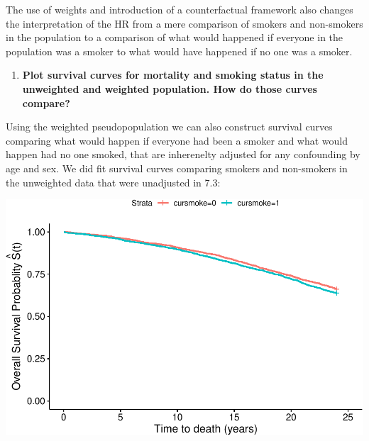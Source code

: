 \documentclass[
]{book}
\newenvironment{Shaded}{\begin{snugshade}}{\end{snugshade}}
\newcommand{\DataTypeTok}[1]{\textcolor[rgb]{0.13,0.29,0.53}{#1}}
\newcommand{\KeywordTok}[1]{\textcolor[rgb]{0.13,0.29,0.53}{\textbf{#1}}}
\newcommand{\NormalTok}[1]{#1}
\newcommand{\OperatorTok}[1]{\textcolor[rgb]{0.81,0.36,0.00}{\textbf{#1}}}
\newcommand{\StringTok}[1]{\textcolor[rgb]{0.31,0.60,0.02}{#1}}
\providecommand{\tightlist}{%
  \setlength{\itemsep}{0pt}\setlength{\parskip}{0pt}}
\begin{document}
The use of weights and introduction of a counterfactual framework also changes the interpretation of the HR from a mere comparison of smokers and non-smokers in the population to a comparison of what would happened if everyone in the population was a smoker to what would have happened if no one was a smoker.

\begin{enumerate}
\def\labelenumi{\arabic{enumi}.}
\setcounter{enumi}{1}
\tightlist
\item
  \textbf{Plot survival curves for mortality and smoking status in the unweighted and weighted population. How do those curves compare?}
\end{enumerate}

Using the weighted pseudopopulation we can also construct survival curves comparing what would happen if everyone had been a smoker and what would happen had no one smoked, that are inherenelty adjusted for any confounding by age and sex. We did fit survival curves comparing smokers and non-smokers in the unweighted data that were unadjusted in 7.3:

\begin{Shaded}
\end{Shaded}

\includegraphics{adv_epi_analysis_files/figure-latex/unnamed-chunk-257-1.pdf}
\end{document}
